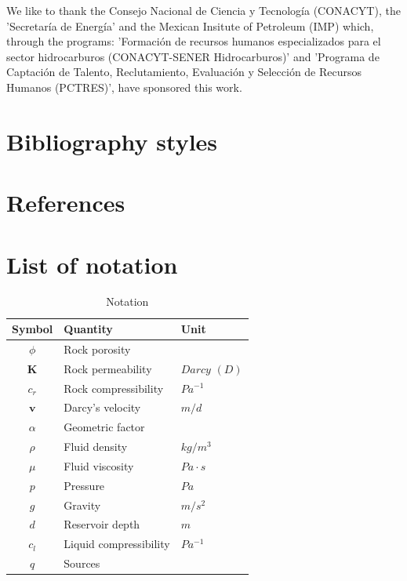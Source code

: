 \documentclass[review]{elsarticle}
\begin{document}
We like to thank the Consejo Nacional de Ciencia y Tecnolog\'ia (CONACYT), the 'Secretar\'ia de Energ\'ia' and the Mexican Insitute of Petroleum (IMP) which, through the programs:  
'Formaci\'on de recursos humanos especializados para el sector hidrocarburos (CONACYT-SENER Hidrocarburos)' and
'Programa de Captaci\'on de Talento, Reclutamiento, Evaluaci\'on y Selecci\'on de Recursos Humanos (PCTRES)', have sponsored this work.  

\section{Bibliography styles}

\section*{References}


\appendix
\section{List of notation}\label{a1}

\begin{table}[!h]
\centering
\begin{tabular}{c l l }
\hline
Symbol & Quantity & Unit \\[0.5ex]
\hline
$\phi$ & Rock porosity&   \\
 $\mathbf{K}$& Rock permeability&  $Darcy$ $(D)$ \\
 $c_r$& Rock compressibility&  $Pa^{-1}$ \\
$\mathbf{v}$ & Darcy's velocity& $ m/d$ \\
 $\alpha$& Geometric factor&   \\
$\rho$ &Fluid density &  $kg/m^3$ \\
 $\mu$&Fluid viscosity & $Pa \cdot s$   \\
${p}$  &Pressure &  $Pa$ \\
$g$  &Gravity &  $m/s^2$ \\
$d$ & Reservoir depth&  $m$ \\
$c_l$ &Liquid compressibility &  $Pa^{-1}$ \\
$q$ &Sources &   \\
\hline
\end{tabular}\label{table:symbols}
\caption{Notation}
\end{table}
\newpage
\end{document}
